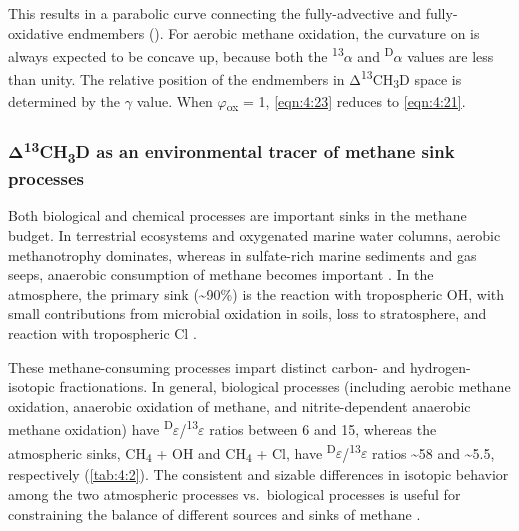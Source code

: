 This results in a parabolic curve connecting the fully-advective and
fully-oxidative endmembers (). For aerobic methane oxidation, the
curvature on  is always expected to be concave up, because both
the \textsuperscript{13}$\alpha$ and \textsuperscript{D}$\alpha$ values are less than
unity. The relative position of the endmembers in
Δ\textsuperscript{13}CH\textsubscript{3}D space is determined by the $\gamma$
value. When $\varphi$\textsubscript{ox} = 1, \autoref{eqn:4:23} reduces to \autoref{eqn:4:21}.

\subsubsection{\texorpdfstring{Δ\textsuperscript{13}CH\textsubscript{3}D as
		an environmental tracer of methane sink
		processes}{Δ13CH3D as an environmental tracer of methane sink processes}}\label{sec:4:13ch3d-as-an-environmental-tracer-of-methane-sink-processes}

Both biological and chemical processes are important sinks in the
methane budget. In terrestrial ecosystems and oxygenated marine water
columns, aerobic methanotrophy dominates, whereas in sulfate-rich marine
sediments and gas seeps, anaerobic consumption of methane becomes
important \parencite{Cicerone+Oremland_1988_GBC,Reeburgh_2007_CR,Valentine_2011_ARMar,Boetius+Wenzhoefer_2013_NG}. In the atmosphere, the primary sink
(\textasciitilde{}90\%) is the reaction with tropospheric OH, with small
contributions from microbial oxidation in soils, loss to stratosphere,
and reaction with tropospheric Cl \parencite{Kirschke++_2013_NG}.

These methane-consuming processes impart distinct carbon- and
hydrogen-isotopic fractionations. In general, biological processes
(including aerobic methane oxidation, anaerobic oxidation of methane,
and nitrite-dependent anaerobic methane oxidation) have
\textsuperscript{D}$\varepsilon$/\textsuperscript{13}$\varepsilon$ ratios between 6 and 15,
whereas the atmospheric sinks, CH\textsubscript{4} + OH and
CH\textsubscript{4} + Cl, have
\textsuperscript{D}$\varepsilon$/\textsuperscript{13}$\varepsilon$ ratios \textasciitilde{}58
and \textasciitilde{}5.5, respectively (\autoref{tab:4:2}). The consistent and
sizable differences in isotopic behavior among the two atmospheric
processes vs.\ biological processes is useful for constraining the
balance of different sources and sinks of methane \parencite[e.g.,][]{Kai++_2011_N,Rigby++_2012_JGR,Whiticar+Schaefer_2007_PTRSA}.

